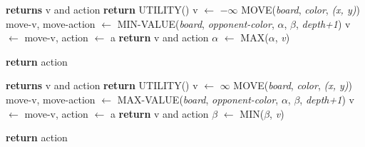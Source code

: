 \documentclass[a4paper, 11pt]{article} %
\begin{document}
\begin{multicols}{2}
\begin{algorithm}[H]
\begin{algorithmic}[1]
			\EndFunction
		\end{algorithmic}
		\begin{algorithmic}[1]
			 \textbf{returns} v and action
			 \textbf{return} UTILITY()
			\EndIf
			\State v $\leftarrow$ $-\infty$
			\State MOVE(\textit{board}, \textit{color}, \textit{(x, y)})
			\State move-v, move-action $\leftarrow$ MIN-VALUE(\textit{board}, \textit{opponent-color}, $\alpha$, $\beta$, \textit{depth+1})
			 v $\leftarrow$ move-v, action $\leftarrow$ a
			\EndIf
			 \textbf{return} v and action
			\EndIf
			\State $\alpha$ $\leftarrow$ MAX($\alpha$, \textit{v})
			\EndFor
	 
			\State \textbf{return} action\\
			\EndFunction
		\end{algorithmic}
		\begin{algorithmic}[1]
			 \textbf{returns} v and action
			 \textbf{return} UTILITY()
			\EndIf
			\State v $\leftarrow$ $\infty$
			\State MOVE(\textit{board}, \textit{color}, \textit{(x, y)})
			\State move-v, move-action $\leftarrow$ MAX-VALUE(\textit{board}, \textit{opponent-color}, $\alpha$, $\beta$, \textit{depth+1})
			 v $\leftarrow$ move-v, action $\leftarrow$ a
			\EndIf
			 \textbf{return} v and action
			\EndIf
			\State $\beta$ $\leftarrow$ MIN($\beta$, \textit{v})
			\EndFor
			
			\State \textbf{return} action\\
			\EndFunction
		\end{algorithmic}
	\end{algorithm}
	
\end{multicols}

\bigskip

\end{document}
